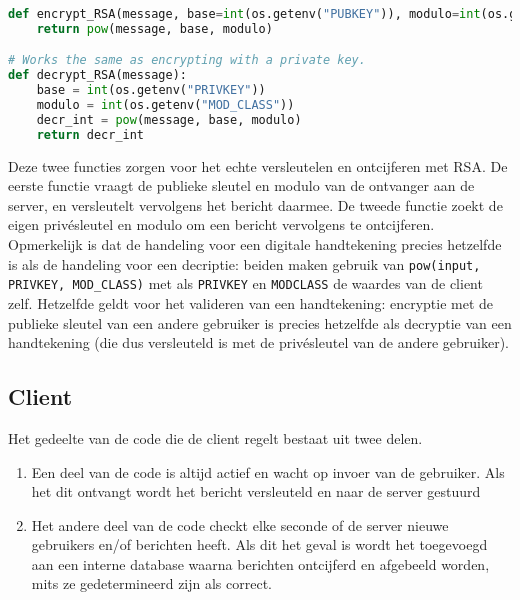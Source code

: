 \documentclass{report} %
\let\code\lstinline
\begin{document}
\begin{lstlisting}[language=Python, firstnumber=73]
def encrypt_RSA(message, base=int(os.getenv("PUBKEY")), modulo=int(os.getenv("MOD_CLASS"))):
    return pow(message, base, modulo)

# Works the same as encrypting with a private key.
def decrypt_RSA(message):
    base = int(os.getenv("PRIVKEY"))
    modulo = int(os.getenv("MOD_CLASS"))
    decr_int = pow(message, base, modulo)
    return decr_int
\end{lstlisting}
Deze twee functies zorgen voor het echte versleutelen en ontcijferen met RSA. De eerste functie vraagt de publieke sleutel en modulo van de ontvanger aan de server, en versleutelt vervolgens het bericht daarmee. De tweede functie zoekt de eigen privésleutel en modulo om een bericht vervolgens te ontcijferen. Opmerkelijk is dat de handeling voor een digitale handtekening precies hetzelfde is als de handeling voor een decriptie: beiden maken gebruik van \code{pow(input, PRIVKEY, MOD_CLASS)} met als \code{PRIVKEY} en \code{MODCLASS} de waardes van de client zelf. Hetzelfde geldt voor het valideren van een handtekening: encryptie met de publieke sleutel van een andere gebruiker is precies hetzelfde als decryptie van een handtekening (die dus versleuteld is met de privésleutel van de andere gebruiker). 

\subsection{Client} %
Het gedeelte van de code die de client regelt bestaat uit twee delen.
\begin{enumerate}
    \item Een deel van de code is altijd actief en wacht op invoer van de gebruiker. Als het dit ontvangt wordt het bericht versleuteld en naar de server gestuurd
    \item Het andere deel van de code checkt elke seconde of de server nieuwe gebruikers en/of berichten heeft. Als dit het geval is wordt het toegevoegd aan een interne database waarna berichten ontcijferd en afgebeeld worden, mits ze gedetermineerd zijn als correct.
\end{enumerate}
\end{document}
